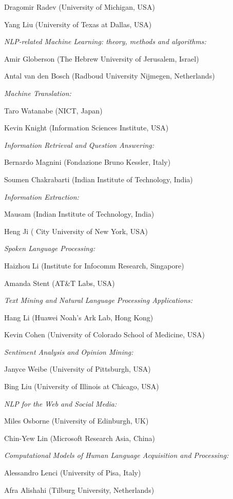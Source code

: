 {Dragomir Radev (University of Michigan, USA)

Yang Liu (University of Texas at Dallas, USA)

\noindent
\textit{NLP-related Machine Learning: theory, methods and algorithms:}

Amir Globerson (The Hebrew University of Jerusalem, Israel)

Antal van den Bosch (Radboud University Nijmegen, Netherlands)

\noindent
\textit{Machine Translation:}

Taro Watanabe (NICT, Japan)

Kevin Knight (Information Sciences Institute, USA)

\noindent
\textit{Information Retrieval and Question Answering:}

Bernardo Magnini (Fondazione Bruno Kessler, Italy)

Soumen Chakrabarti (Indian Institute of Technology, India)

\noindent
\textit{Information Extraction:}

Mausam (Indian Institute of Technology, India)

Heng Ji ( City University of New York, USA)

\noindent
\textit{Spoken Language Processing:}

Haizhou Li (Institute for Infocomm Research, Singapore)

Amanda Stent (AT\&T Labs, USA)

\noindent
\textit{Text Mining and Natural Language Processing Applications:}

Hang Li (Huawei Noah's Ark Lab, Hong Kong)

Kevin Cohen (University of Colorado School of Medicine, USA)

\noindent
\textit{Sentiment Analysis and Opinion Mining:}

Janyce Weibe (University of Pittsburgh, USA)

Bing Liu (University of Illinois at Chicago, USA)

\noindent
\textit{NLP for the Web and Social Media:}

Miles Osborne (University of Edinburgh, UK)

Chin-Yew Lin (Microsoft Research Asia, China)

\noindent
\textit{Computational Models of Human Language Acquisition and Processing:}

Alessandro Lenci (University of Pisa, Italy)

Afra Alishahi (Tilburg University, Netherlands)
}

